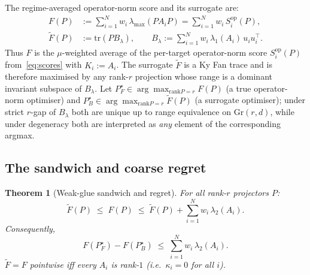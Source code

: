 \documentclass[final,3p,times]{elsarticle}
\newtheorem{theorem}{Theorem}
\newcommand{\Gr}{\mathrm{Gr}}
\newcommand{\tr}{\mathrm{tr}}
\newcommand{\rank}{\mathrm{rank}}
\begin{document}
The regime-averaged operator-norm score and its surrogate are:
\begin{align}
F(P) &:= \sum_{i=1}^N w_i\,\lambda_{\max}(P A_i P)
        =\sum_{i=1}^N w_i\,S^{\mathrm{op}}_i(P), \label{eq:F}\\
\tilde F(P) &:= \tr(P B_\lambda),\qquad
B_\lambda := \sum_{i=1}^N w_i\,\lambda_1(A_i)\,u_i u_i^\top.
\label{eq:Btilde}
\end{align}
Thus $F$ is the $\mu$-weighted average of the per-target operator-norm
score $S^{\mathrm{op}}_i(P)$ from~\eqref{eq:scores} with $K_i:=A_i$.
The surrogate $\tilde F$ is a Ky Fan trace and is therefore maximised by
any rank-$r$ projection whose range is a dominant invariant subspace of
$B_\lambda$.
Let $P_F^\star\in\arg\max_{\rank P=r} F(P)$ (a true operator-norm optimiser)
and $P_B^\star\in\arg\max_{\rank P=r}\tilde F(P)$ (a surrogate optimiser);
under strict $r$-gap of $B_\lambda$ both are unique up to range
equivalence on $\Gr(r,d)$, while under degeneracy both are interpreted as
\emph{any} element of the corresponding argmax.

\subsection{The sandwich and coarse regret}

\begin{theorem}[Weak-glue sandwich and regret]\label{thm:weakglue}
For all rank-$r$ projectors $P$:
\begin{equation}\label{eq:sandwich}
\tilde F(P)\;\le\;F(P)\;\le\;\tilde F(P)+\sum_{i=1}^N w_i\,\lambda_2(A_i).
\end{equation}
Consequently,
\begin{equation}\label{eq:coarse}
F(P_F^\star)-F(P_B^\star)\;\le\;\sum_{i=1}^N w_i\,\lambda_2(A_i).
\end{equation}
$\tilde F=F$ pointwise iff every $A_i$ is rank-$1$ (i.e.\ $\kappa_i=0$
for all $i$).
\end{theorem}
\end{document}
